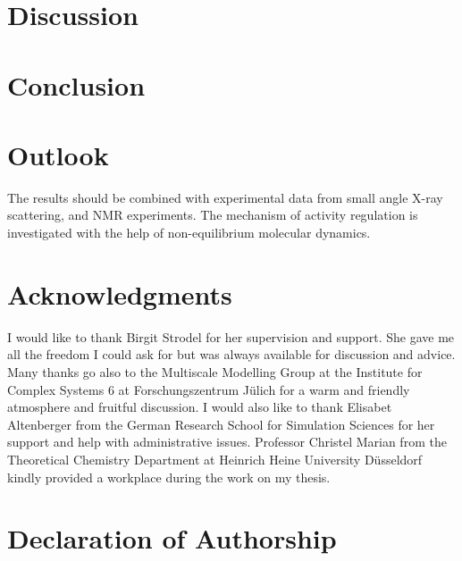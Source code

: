 \documentclass[english, a4paper, 12pt, titlepage, draft]{article}
\begin{document}

\section{Discussion}


\section{Conclusion}


\section{Outlook}
The results should be combined with experimental data from small angle X-ray scattering, and NMR experiments. The mechanism of activity regulation is investigated with the help of non-equilibrium molecular dynamics.



\pagebreak

\section{Acknowledgments}

I would like to thank Birgit Strodel for her supervision and support.
She gave me all the freedom I could ask for but was always available for discussion and advice.
Many thanks go also to the Multiscale Modelling Group at the Institute for Complex Systems 6 at Forschungszentrum J\"ulich for a warm and friendly atmosphere and fruitful discussion.
I would also like to thank Elisabet Altenberger from the German Research School for Simulation Sciences for her support and help with administrative issues.
Professor Christel Marian from the Theoretical Chemistry Department at Heinrich Heine University D\"usseldorf kindly provided a workplace during the work on my thesis.



\section{Declaration of Authorship}
\end{document}
